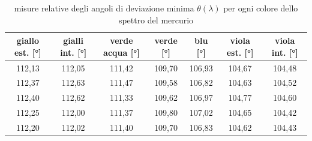 \documentclass{article}
\begin{document}
        \begin{table}[H]

            \centering
            \begin{tabular}{c c c c c c c}

                \toprule 
                \textbf{giallo est.} [°] & \textbf{gialli int.} [°]& \textbf{verde acqua} [°]& 
                \textbf{verde} [°]& \textbf{blu} [°]& \textbf{viola est.} [°]& \textbf{viola int.} [°]  \\
                
                \midrule
                112,13	&	112,05	&	111,42	&	109,70	&	106,93	&	104,67	&	104,48\\
                112,37	&	112,63	&	111,47	&	109,58	&	106,82	&	104,63	&	104,52\\
                112,40	&	112,62	&	111,33	&	109,62	&	106,97	&	104,77	&	104,60\\
                112,25	&	112,00	&	111,37	&	109,80	&	107,02	&	104,65	&	104,42\\
                112,20	&	112,02	&	111,40	&	109,70	&	106,83	&	104,62	&	104,43\\
                \bottomrule

            \end{tabular}

            \caption{misure relative degli angoli di deviazione minima $\theta(\lambda)$ per ogni colore dello spettro del mercurio}
            \label{tabular:theta misure}

        \end{table}
\end{document}
